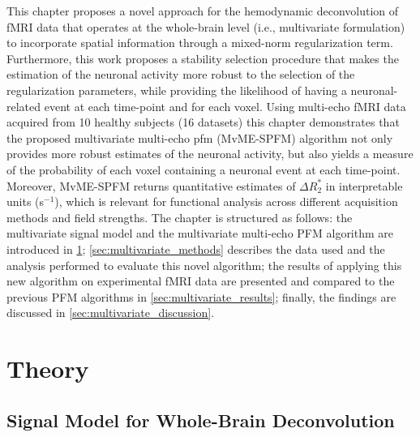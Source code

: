 This chapter proposes a novel approach for the hemodynamic deconvolution of fMRI
data that operates at the whole-brain level (i.e., multivariate formulation) to
incorporate spatial information through a mixed-norm regularization term.
Furthermore, this work proposes a stability selection procedure
\citep{Meinshausen2010Stabilityselection} that makes the estimation of the
neuronal activity more robust to the selection of the regularization parameters,
while providing the likelihood of having a neuronal-related event at each
time-point and for each voxel. Using multi-echo fMRI data acquired from 10
healthy subjects (16 datasets) this chapter demonstrates that the proposed
multivariate multi-echo \acrlong*{pfm} (MvME-SPFM) algorithm not only provides
more robust estimates of the neuronal activity, but also yields a measure of the
probability of each voxel containing a neuronal event at each time-point.
Moreover, MvME-SPFM returns quantitative estimates of $\Delta R_2^*$ in
interpretable units (s$^{-1}$), which is relevant for functional analysis across
different acquisition methods and field strengths. The chapter is structured as
follows: the multivariate signal model and the multivariate multi-echo PFM
algorithm are introduced in \cref{sec:multivariate_theory};
\cref{sec:multivariate_methods} describes the data used and the analysis
performed to evaluate this novel algorithm; the results of applying this new
algorithm on experimental fMRI data are presented and compared to the previous
PFM algorithms in \cref{sec:multivariate_results}; finally, the findings are
discussed in \cref{sec:multivariate_discussion}.

\section{Theory}
\label{sec:multivariate_theory}

\subsection{Signal Model for Whole-Brain Deconvolution}

